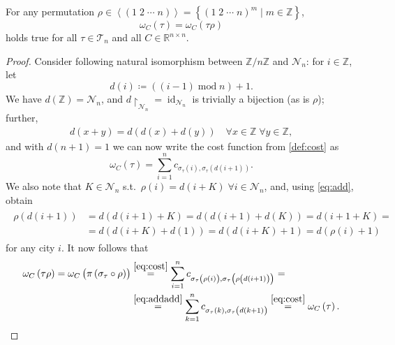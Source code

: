 \documentclass[index=totoc,bibliography=totoc]{scrartcl}
\numberwithin{equation}{section}
\numberwithin{figure}{section}
\numberwithin{table}{section}
\begin{document}
\begin{proposition}
\label{prop:rotinv}
  For any permutation $\rho \in \left<\left(1 \; 2 \; \cdots \; n \right)\right>
  = \left\{{\left(1 \; 2 \; \cdots \; n \right)}^m \mid m \in \mathbb{Z} \right\}$,
  \[
    \omega_C\left(\tau\right) = \omega_C\left(\tau \rho\right)
  \]
  holds true for all $\tau \in \mathcal{T}_n$ and all $C \in \mathbb{R}^{n \times n}$.
\end{proposition}
\begin{proof}
  Consider following natural isomorphism between $\mathbb{Z}/n\mathbb{Z}$ and $\mathcal{N}_n$:
  for $i \in \mathbb{Z}$, let
  \[
    d\left(i\right) \coloneqq \left(\left(i-1\right)\operatorname{mod} n\right)+1.
  \]
  We have $d\left(\mathbb{Z}\right) = \mathcal{N}_n$,
  and $d\restriction_{\mathcal{N}_n} = \operatorname{id}_{\mathcal{N}_n}$
  is trivially a bijection (as is $\rho$); further,
  \begin{align}
    \label{eq:add}
    d\left(x+y\right) =
    d\left(d\left(x\right) + d\left(y\right)\right)
    \quad \forall x \in \mathbb{Z} \; \forall y \in \mathbb{Z},
  \end{align}
  and with $d\left(n+1\right) = 1$ we can now write the cost function from \cref{def:cost} as
  \begin{equation}
  \label{eq:cost}
    \omega_C\left(\tau\right) =
    \sum_{i=1}^n c_{\sigma_\tau\left(i\right),\sigma_\tau\left(d\left(i+1\right)\right)}.
  \end{equation}
  We also note that \exists $K \in \mathcal{N}_n$ s.t.\ 
  $\rho\left(i\right) = d\left(i+K\right) \; \forall i \in \mathcal{N}_n$,
  and, using \cref{eq:add}, obtain
  \begin{align}
    \label{eq:addadd}
    \begin{split}
    \rho \left(d\left(i+1\right)\right)
    & =
    d\left(d\left(i+1\right)+K\right) =
    d\left(d\left(i+1\right)+d\left(K\right)\right) =
    d\left(i+1+K\right) =
    \\
    & =
    d\left(d\left(i+K\right)+d\left(1\right)\right) =
    d\left(d\left(i+K\right)+1\right) =
    d\left(\rho\left(i\right)+1\right)
    \end{split}
  \end{align}
  for any city $i$.
  It now follows that
  \begin{align*}
    \omega_C\left(\tau \rho\right) =
    \omega_C\left(\pi\left(\sigma_\tau \circ \rho\right)\right)
    & \stackrel{\eqref{eq:cost}}{=}
    \sum_{i=1}^n c_{\sigma_\tau\left(\rho\left(i\right)\right),
                    \sigma_\tau\left(\rho\left(d\left(i+1\right)\right)\right)}
    =
    \\
    & \stackrel{\eqref{eq:addadd}}{=}
    \sum_{k=1}^n c_{\sigma_\tau\left(k\right),
                    \sigma_\tau\left(d\left(k+1\right)\right)}
    \stackrel{\eqref{eq:cost}}{=}
    \omega_C\left(\tau\right).
  \end{align*}
\end{proof}
\end{document}
